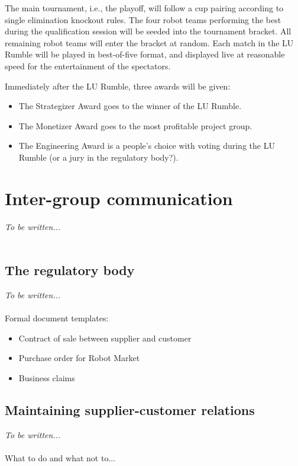 \documentclass{scrreprt}
\begin{document}
The main tournament, i.e., the playoff, will follow a cup pairing according to single elimination knockout rules. The four robot teams performing the best during the qualification session will be seeded into the tournament bracket. All remaining robot teams will enter the bracket at random. Each match in the LU Rumble will be played in best-of-five format, and displayed live at reasonable speed for the entertainment of the spectators.

Immediately after the LU Rumble, three awards will be given:
\begin{itemize}
\item The Strategizer Award goes to the winner of the LU Rumble.
\item The Monetizer Award goes to the most profitable project group.
\item The Engineering Award is a people's choice with voting during the LU Rumble (or a jury in the regulatory body?).
\end{itemize}

\chapter{Inter-group communication}
\emph{To be written...}\\\\

\section{The regulatory body} \label{sec:regbody}
\emph{To be written...}\\\\
Formal document templates:

\begin{itemize}
\item Contract of sale between supplier and customer
\item Purchase order for Robot Market
\item Business claims
\end{itemize}

\section{Maintaining supplier-customer relations}
\emph{To be written...}\\\\
What to do and what not to...\\
\end{document}
